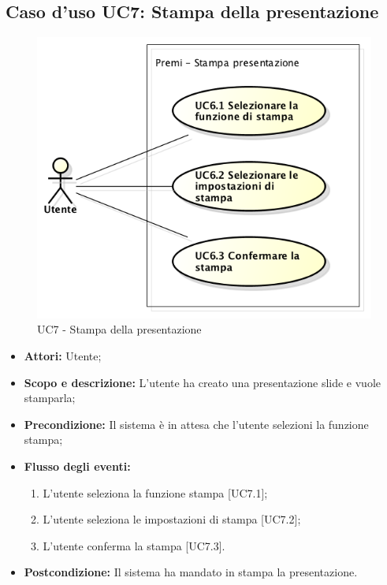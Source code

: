 \subsection{Caso d'uso UC7: Stampa della presentazione}
\begin{figure}[h] 
	\centering 
	\includegraphics[scale=0.45] {img/UC7.png} 
	\caption{UC7 - Stampa della presentazione} 
\end{figure}

\begin{itemize}
	\item \textbf{Attori:} Utente;
	\item \textbf{Scopo e descrizione:} L'utente ha creato una presentazione slide e vuole stamparla;
	\item \textbf{Precondizione:} Il sistema è in attesa che l'utente selezioni la funzione stampa;
	\item \textbf{Flusso degli eventi:}
	\begin{enumerate}
		\item L'utente seleziona la funzione stampa [UC7.1];
		\item L'utente seleziona le impostazioni di stampa [UC7.2];
		\item L'utente conferma la stampa [UC7.3].
	\end{enumerate}
	\item \textbf{Postcondizione:} Il sistema ha mandato in stampa la presentazione.
\end{itemize}

